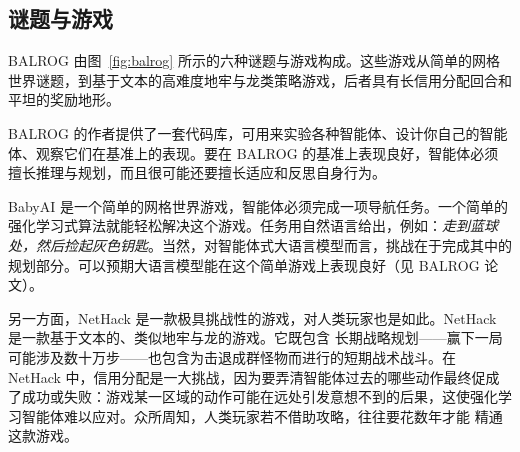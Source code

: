 \subsection{谜题与游戏}
BALROG 由图~\ref{fig:balrog} 所示的六种谜题与游戏构成。这些游戏从简单的网格世界谜题，到基于文本的高难度地牢与龙类策略游戏，后者具有长信用分配回合和平坦的奖励地形。

BALROG 的作者提供了一套代码库，可用来实验各种智能体、设计你自己的智能体、观察它们在基准上的表现。要在 BALROG 的基准上表现良好，智能体必须擅长推理与规划，而且很可能还要擅长适应和反思自身行为。





BabyAI 是一个简单的网格世界游戏，智能体必须完成一项导航任务。一个简单的强化学习式算法就能轻松解决这个游戏。任务用自然语言给出，例如：{\em 走到蓝球处，然后捡起灰色钥匙}。当然，对智能体式大语言模型而言，挑战在于完成其中的规划部分。可以预期大语言模型能在这个简单游戏上表现良好（见 BALROG 论文）。

另一方面，NetHack 是一款极具挑战性的游戏，对人类玩家也是如此。NetHack 是一款基于文本的、类似地牢与龙的游戏。它既包含
长期战略规划——赢下一局可能涉及数十万步——也包含为击退成群怪物而进行的短期战术战斗。在 NetHack 中，信用分配是一大挑战，因为要弄清智能体过去的哪些动作最终促成了成功或失败：游戏某一区域的动作可能在远处引发意想不到的后果，这使强化学习智能体难以应对。众所周知，人类玩家若不借助攻略，往往要花数年才能
精通这款游戏。

